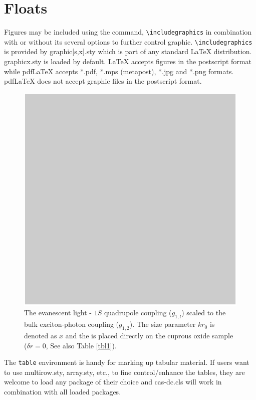 \documentclass[a4paper,fleqn]{cas-dc}
\begin{document}
\section{Floats}
{Figures} may be included using the command,\linebreak 
\verb+\includegraphics+ in
combination with or without its several options to further control
graphic. \verb+\includegraphics+ is provided by {graphic[s,x].sty}
which is part of any standard \LaTeX{} distribution.
{graphicx.sty} is loaded by default. \LaTeX{} accepts figures in
the postscript format while pdf\LaTeX{} accepts {*.pdf},
{*.mps} (metapost), {*.jpg} and {*.png} formats. 
pdf\LaTeX{} does not accept graphic files in the postscript format. 

\begin{figure}
	\centering
		\includegraphics[scale=.75]{figs/Fig1.pdf}
	\caption{The evanescent light - $1S$ quadrupole coupling
	($g_{1,l}$) scaled to the bulk exciton-photon coupling
	($g_{1,2}$). The size parameter $kr_{0}$ is denoted as $x$ and
	the \PMS is placed directly on the cuprous oxide sample ($\delta
	r=0$, See also Table \protect\ref{tbl1}).}
	\label{FIG:1}
\end{figure}


The \verb+table+ environment is handy for marking up tabular
material. If users want to use {multirow.sty},
{array.sty}, etc., to fine control/enhance the tables, they
are welcome to load any package of their choice and
{cas-dc.cls} will work in combination with all loaded
packages.
\end{document}
